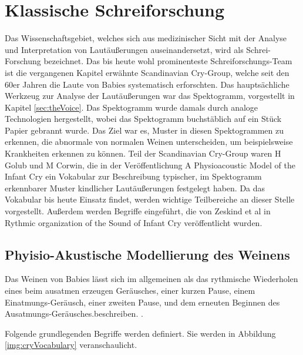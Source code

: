 \section{Klassische Schreiforschung}

Das Wissenschaftsgebiet, welches sich aus medizinischer Sicht mit der Analyse und Interpretation von Lautäußerungen auseinandersetzt, wird als \grqq Schrei-Forschung\glqq{} bezeichnet. Das bis heute wohl prominenteste Schreiforschungs-Team ist die vergangenen Kapitel erwähnte \glqq Scandinavian Cry-Group\grqq \cite{cryGroup}, welche seit den 60er Jahren die Laute von Babies systematisch erforschten. Das hauptsächliche Werkzeug zur Analyse der Lautäußerungen war das Spektogramm, vorgestellt in Kapitel \ref{sec:theVoice}. Das Spektogramm wurde damals durch analoge Technologien hergestellt, wobei das Spektogramm buchstäblich auf ein Stück Papier gebrannt wurde.  Das Ziel war es, Muster  in diesen Spektogrammen zu erkennen, die abnormale von normalen Weinen unterscheiden, um beispielsweise Krankheiten erkennen zu können. \cite[S. 142]{signal} Teil der Scandinavian Cry-Group waren H Golub und M Corwin, die in der Veröffentlichung \glqq A Physioacoustic Model of the Infant Cry \grqq{} \cite{cryModel} ein Vokabular zur Beschreibung typischer, im Spektogramm erkennbarer Muster kindlicher Lautäußerungen festgelegt haben. Da das Vokabular bis heute Einsatz findet, werden wichtige Teilbereiche an dieser Stelle vorgestellt. Außerdem werden Begriffe eingeführt, die von Zeskind et al in \glqq Rythmic organization of the Sound of Infant Cry \grqq{} veröffentlicht wurden.\cite{rythmic}

\subsection{Phyisio-Akustische Modellierung des Weinens}
\label{sec:acousticModel}

Das Weinen von Babies lässt sich im allgemeinen als das \glqq rythmische Wiederholen eines beim ausatmen erzeugen Geräusches, einer kurzen Pause, einem Einatmungs-Geräusch, einer zweiten Pause, und dem erneuten Beginnen des Ausatmungs-Geräusches.\grqq beschreiben. \cite{wolff}.

Folgende grundlegenden Begriffe werden definiert. Sie werden in Abbildung \ref{img:cryVocabulary} veranschaulicht.

